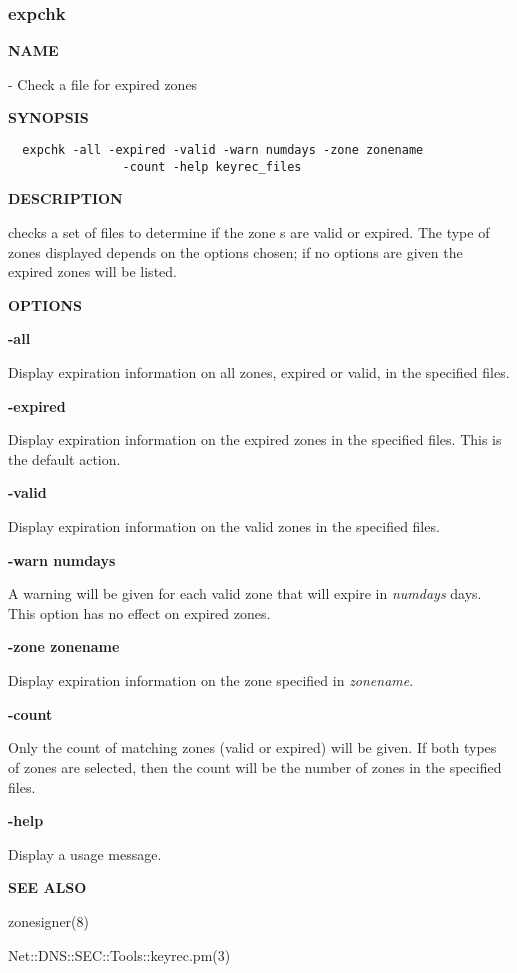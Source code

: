 \clearpage

\subsubsection{expchk}

{\bf NAME}

 - Check a  file for expired zones

{\bf SYNOPSIS}

\begin{verbatim}
  expchk -all -expired -valid -warn numdays -zone zonename
                -count -help keyrec_files
\end{verbatim}

{\bf DESCRIPTION}

 checks a set of  files to determine if the zone
s are valid or expired.  The type of zones displayed depends on
the options chosen; if no options are given the expired zones will be listed.

{\bf OPTIONS}

\begin{description}

\item {\bf -all}\verb" "

Display expiration information on all zones, expired or valid, in the
specified  files.

\item {\bf -expired}\verb" "

Display expiration information on the expired zones in the specified
 files.  This is the default action.

\item {\bf -valid}\verb" "

Display expiration information on the valid zones in the specified
 files.

\item {\bf -warn numdays}\verb" "

A warning will be given for each valid zone that will expire in {\it numdays}
days.  This option has no effect on expired zones.

\item {\bf -zone zonename}\verb" "

Display expiration information on the zone specified in {\it zonename}.

\item {\bf -count}\verb" "

Only the count of matching zones (valid or expired) will be given.  If both
types of zones are selected, then the count will be the number of zones in the
specified  files.

\item {\bf -help}\verb" "

Display a usage message.

\end{description}

{\bf SEE ALSO}

zonesigner(8)

Net::DNS::SEC::Tools::keyrec.pm(3)


